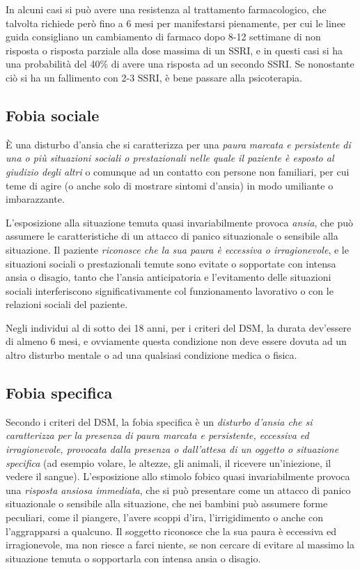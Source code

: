In alcuni casi si può avere una resistenza al trattamento farmacologico,
che talvolta richiede però fino a 6 mesi per manifestarsi pienamente,
per cui le linee guida consigliano un cambiamento di farmaco dopo 8-12
settimane di non risposta o risposta parziale alla dose massima di un
SSRI, e in questi casi si ha una probabilità del 40\% di avere una
risposta ad un secondo SSRI. Se nonostante ciò si ha un fallimento con
2-3 SSRI, è bene passare alla psicoterapia.

\subsection{Fobia sociale}

È una disturbo d'ansia che si caratterizza per una \emph{paura marcata e
persistente di una o più situazioni sociali o prestazionali nelle quale
il paziente è esposto al giudizio degli altri} o comunque ad un contatto
con persone non familiari, per cui teme di agire (o anche solo di
mostrare sintomi d'ansia) in modo umiliante o imbarazzante.

L'esposizione alla situazione temuta quasi invariabilmente provoca
\emph{ansia}, che può assumere le caratteristiche di un attacco di
panico situazionale o sensibile alla situazione. Il paziente
\emph{riconosce che la sua paura è eccessiva o irragionevole}, e le
situazioni sociali o prestazionali temute sono evitate o sopportate con
intensa ansia o disagio, tanto che l'ansia anticipatoria e l'evitamento
delle situazioni sociali interferiscono significativamente col
funzionamento lavorativo o con le relazioni sociali del paziente.

Negli individui al di sotto dei 18 anni, per i criteri del DSM, la
durata dev'essere di almeno 6 mesi, e ovviamente questa condizione non
deve essere dovuta ad un altro disturbo mentale o ad una qualsiasi
condizione medica o fisica.

\subsection{Fobia specifica}

Secondo i criteri del DSM, la fobia specifica è un \emph{disturbo
d'ansia che si caratterizza per la presenza di paura marcata e
persistente, eccessiva ed irragionevole, provocata dalla presenza o
dall'attesa di un oggetto o situazione specifica} (ad esempio volare, le
altezze, gli animali, il ricevere un'iniezione, il vedere il sangue).
L'esposizione allo stimolo fobico quasi invariabilmente provoca una
\emph{risposta ansiosa immediata}, che si può presentare come un attacco
di panico situazionale o sensibile alla situazione, che nei bambini può
assumere forme peculiari, come il piangere, l'avere scoppi d'ira,
l'irrigidimento o anche con l'aggrapparsi a qualcuno. Il soggetto
riconosce che la sua paura è eccessiva ed irragionevole, ma non riesce a
farci niente, se non cercare di evitare al massimo la situazione temuta
o sopportarla con intensa ansia o disagio.

